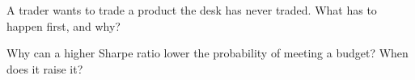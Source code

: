 \begin{interviewq}\label{iq:fm:the-head-of-desks-job:5}
A trader wants to trade a product the desk has never traded. What has to happen first, and why?
\end{interviewq}

\begin{interviewq}\label{iq:fm:the-head-of-desks-job:6}
Why can a higher Sharpe ratio lower the probability of meeting a budget? When does it raise it?
\end{interviewq}
